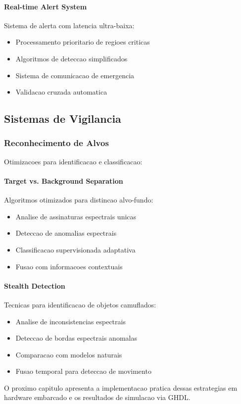 \paragraph{Real-time Alert System}
Sistema de alerta com latencia ultra-baixa:
\begin{itemize}
    \item Processamento prioritario de regioes criticas
    \item Algoritmos de deteccao simplificados
    \item Sistema de comunicacao de emergencia
    \item Validacao cruzada automatica
\end{itemize}

\subsection{Sistemas de Vigilancia}

\subsubsection{Reconhecimento de Alvos}
Otimizacoes para identificacao e classificacao:

\paragraph{Target vs. Background Separation}
Algoritmos otimizados para distincao alvo-fundo:
\begin{itemize}
    \item Analise de assinaturas espectrais unicas
    \item Deteccao de anomalias espectrais
    \item Classificacao supervisionada adaptativa
    \item Fusao com informacoes contextuais
\end{itemize}

\paragraph{Stealth Detection}
Tecnicas para identificacao de objetos camuflados:
\begin{itemize}
    \item Analise de inconsistencias espectrais
    \item Deteccao de bordas espectrais anomalas
    \item Comparacao com modelos naturais
    \item Fusao temporal para deteccao de movimento
\end{itemize}

O proximo capitulo apresenta a implementacao pratica dessas estrategias em hardware embarcado e os resultados de simulacao via GHDL. 